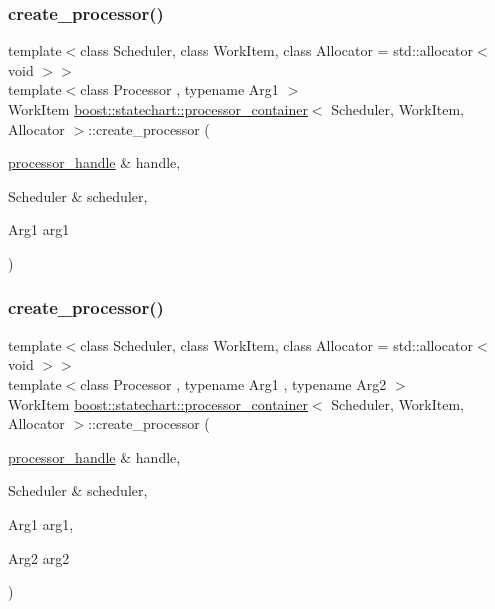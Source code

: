 \subsubsection{\texorpdfstring{create\+\_\+processor()}{create\_processor()}\hspace{0.1cm}{\footnotesize\ttfamily [2/7]}}
{\footnotesize\ttfamily template$<$class Scheduler, class Work\+Item, class Allocator = std\+::allocator$<$ void $>$$>$ \\
template$<$class Processor , typename Arg1 $>$ \\
Work\+Item \mbox{\hyperlink{classboost_1_1statechart_1_1processor__container}{boost\+::statechart\+::processor\+\_\+container}}$<$ Scheduler, Work\+Item, Allocator $>$\+::create\+\_\+processor (\begin{DoxyParamCaption}\item[{\mbox{\hyperlink{classboost_1_1statechart_1_1processor__container_a82ebbffaed81d7b99119ae0e892f6411}{processor\+\_\+handle}} \&}]{handle,  }\item[{Scheduler \&}]{scheduler,  }\item[{Arg1}]{arg1 }\end{DoxyParamCaption})\hspace{0.3cm}{\ttfamily [inline]}}

\mbox{\label{classboost_1_1statechart_1_1processor__container_a223cc5302da135270a30d69739efb0dd}} 
\subsubsection{\texorpdfstring{create\+\_\+processor()}{create\_processor()}\hspace{0.1cm}{\footnotesize\ttfamily [3/7]}}
{\footnotesize\ttfamily template$<$class Scheduler, class Work\+Item, class Allocator = std\+::allocator$<$ void $>$$>$ \\
template$<$class Processor , typename Arg1 , typename Arg2 $>$ \\
Work\+Item \mbox{\hyperlink{classboost_1_1statechart_1_1processor__container}{boost\+::statechart\+::processor\+\_\+container}}$<$ Scheduler, Work\+Item, Allocator $>$\+::create\+\_\+processor (\begin{DoxyParamCaption}\item[{\mbox{\hyperlink{classboost_1_1statechart_1_1processor__container_a82ebbffaed81d7b99119ae0e892f6411}{processor\+\_\+handle}} \&}]{handle,  }\item[{Scheduler \&}]{scheduler,  }\item[{Arg1}]{arg1,  }\item[{Arg2}]{arg2 }\end{DoxyParamCaption})\hspace{0.3cm}{\ttfamily [inline]}}

